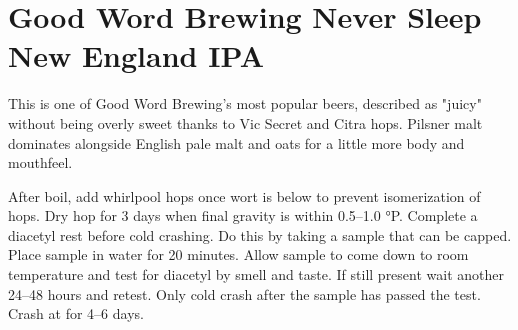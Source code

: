 \documentclass[10pt,oneside]{scrbook}
\begin{document}
\pagebreak

\begin{ingredientsblock}

\begin{malts}
\end{malts}

\begin{hops}
\end{hops}

\begin{yeasts}
\end{yeasts}

\end{ingredientsblock}

\chapter*{Good Word Brewing Never Sleep New England IPA}

\begin{aboutblock}
This is one of Good Word Brewing's most popular beers, described as "juicy" without being overly
sweet thanks to Vic Secret and Citra hops. Pilsner malt dominates alongside English pale malt and
oats for a little more body and mouthfeel.
\end{aboutblock}


\begin{methodandtiming}
 
\begin{mashsteps}
\end{mashsteps}

\begin{fermentationsteps}
\end{fermentationsteps}

\begin{directions}
After boil, add whirlpool hops once wort is below  to prevent isomerization of hops.
Dry hop for 3 days when final gravity is within 0.5--1.0 °P. Complete a diacetyl rest before
cold crashing. Do this by taking a  sample that can be capped. Place sample in
 water for 20 minutes. Allow sample to come down to room temperature and test for
diacetyl by smell and taste. If still present wait another 24--48 hours and retest.
Only cold crash after the sample has passed the test. Crash at  for 4--6 days.
\end{directions}

\end{methodandtiming}
\end{document}
